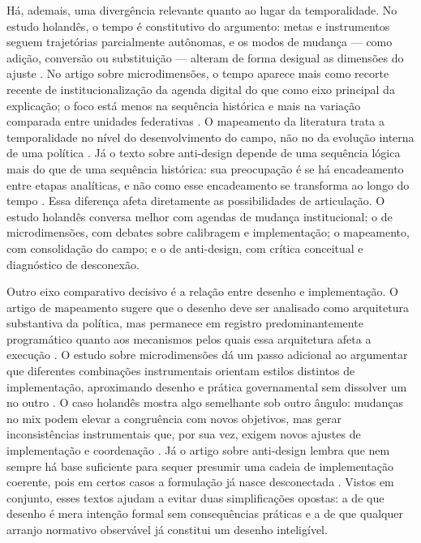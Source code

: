 \documentclass[12pt,a4paper]{article}
\begin{document}
Há, ademais, uma divergência relevante quanto ao lugar da temporalidade. No estudo holandês, o tempo é constitutivo do argumento: metas e instrumentos seguem trajetórias parcialmente autônomas, e os modos de mudança — como adição, conversão ou substituição — alteram de forma desigual as dimensões do ajuste \parencite{geet2019_policy_design}. No artigo sobre microdimensões, o tempo aparece mais como recorte recente de institucionalização da agenda digital do que como eixo principal da explicação; o foco está menos na sequência histórica e mais na variação comparada entre unidades federativas \parencite{lui2026_micro_dimensions}. O mapeamento da literatura trata a temporalidade no nível do desenvolvimento do campo, não no da evolução interna de uma política \parencite{lima2021_conectando_problemas}. Já o texto sobre anti-design depende de uma sequência lógica mais do que de uma sequência histórica: sua preocupação é se há encadeamento entre etapas analíticas, e não como esse encadeamento se transforma ao longo do tempo \parencite{newman2020_policy_design}. Essa diferença afeta diretamente as possibilidades de articulação. O estudo holandês conversa melhor com agendas de mudança institucional; o de microdimensões, com debates sobre calibragem e implementação; o mapeamento, com consolidação do campo; e o de anti-design, com crítica conceitual e diagnóstico de desconexão.

Outro eixo comparativo decisivo é a relação entre desenho e implementação. O artigo de mapeamento sugere que o desenho deve ser analisado como arquitetura substantiva da política, mas permanece em registro predominantemente programático quanto aos mecanismos pelos quais essa arquitetura afeta a execução \parencite{lima2021_conectando_problemas}. O estudo sobre microdimensões dá um passo adicional ao argumentar que diferentes combinações instrumentais orientam estilos distintos de implementação, aproximando desenho e prática governamental sem dissolver um no outro \parencite{lui2026_micro_dimensions}. O caso holandês mostra algo semelhante sob outro ângulo: mudanças no mix podem elevar a congruência com novos objetivos, mas gerar inconsistências instrumentais que, por sua vez, exigem novos ajustes de implementação e coordenação \parencite{geet2019_policy_design}. Já o artigo sobre anti-design lembra que nem sempre há base suficiente para sequer presumir uma cadeia de implementação coerente, pois em certos casos a formulação já nasce desconectada \parencite{newman2020_policy_design}. Vistos em conjunto, esses textos ajudam a evitar duas simplificações opostas: a de que desenho é mera intenção formal sem consequências práticas e a de que qualquer arranjo normativo observável já constitui um desenho inteligível.
\end{document}
